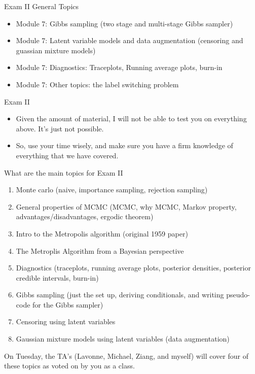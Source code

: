 \documentclass[
  ignorenonframetext,
]{beamer}
\providecommand{\tightlist}{%
  \setlength{\itemsep}{0pt}\setlength{\parskip}{0pt}}
\begin{document}
\begin{frame}{Exam II General Topics}
\protect\hypertarget{exam-ii-general-topics-1}{}

\begin{itemize}
\tightlist
\item
  Module 7: Gibbs sampling (two stage and multi-stage Gibbs sampler)
\item
  Module 7: Latent variable models and data augmentation (censoring and
  guassian mixture models)
\item
  Module 7: Diagnostics: Traceplots, Running average plots, burn-in
\item
  Module 7: Other topics: the label switching problem
\end{itemize}

\end{frame}

\begin{frame}{Exam II}
\protect\hypertarget{exam-ii-2}{}

\begin{itemize}
\tightlist
\item
  Given the amount of material, I will not be able to test you on
  everything above. It's just not possible.
\item
  So, use your time wisely, and make sure you have a firm knowledge of
  everything that we have covered.
\end{itemize}

\end{frame}

\begin{frame}{What are the main topics for Exam II}
\protect\hypertarget{what-are-the-main-topics-for-exam-ii}{}

\begin{enumerate}
\tightlist
\item
  Monte carlo (naive, importance sampling, rejection sampling)
\item
  General properties of MCMC (MCMC, why MCMC, Markov property,
  advantages/disadvantages, ergodic theorem)
\item
  Intro to the Metropolis algorithm (original 1959 paper)
\item
  The Metroplis Algorithm from a Bayesian perspective
\item
  Diagnostics (traceplots, running average plots, posterior densities,
  posterior credible intervals, burn-in)
\item
  Gibbs sampling (just the set up, deriving conditionals, and writing
  pseudo-code for the Gibbs sampler)
\item
  Censoring using latent variables
\item
  Gaussian mixture models using latent variables (data augmentation)
\end{enumerate}

On Tuesday, the TA's (Lavonne, Michael, Ziang, and myself) will cover
four of these topics as voted on by you as a class.

\end{frame}
\end{document}

